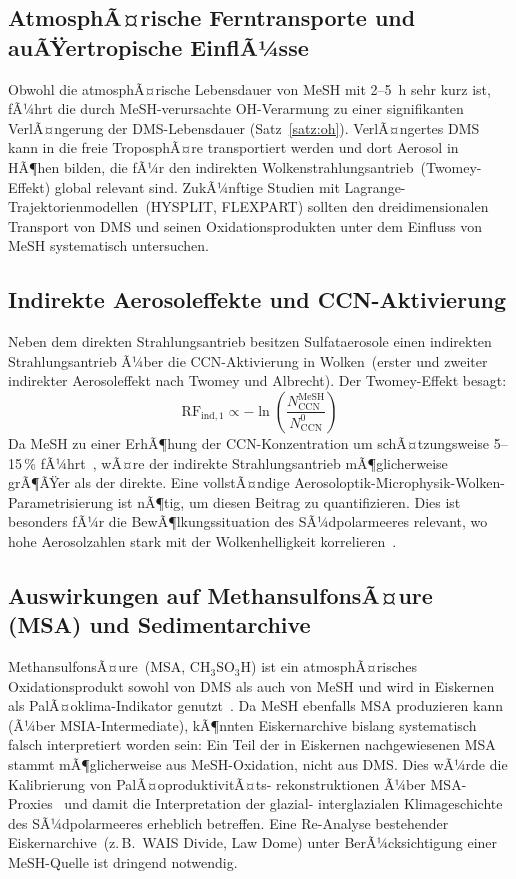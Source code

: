 ﻿\documentclass[a4paper,12pt]{article}
\theoremstyle{definition}
\begin{document}
\subsection{AtmosphÃ¤rische Ferntransporte und auÃŸertropische EinflÃ¼sse}

Obwohl die atmosphÃ¤rische Lebensdauer von MeSH mit 2--5~h sehr kurz ist, fÃ¼hrt die durch
MeSH-verursachte OH-Verarmung zu einer signifikanten VerlÃ¤ngerung der DMS-Lebensdauer (Satz~\ref{satz:oh}).
VerlÃ¤ngertes DMS kann in die freie TroposphÃ¤re transportiert werden und dort Aerosol in
HÃ¶hen bilden, die fÃ¼r den indirekten Wolkenstrahlungsantrieb~(Twomey-Effekt) global relevant sind.
ZukÃ¼nftige Studien mit Lagrange-Trajektorienmodellen~(HYSPLIT, FLEXPART) sollten den
dreidimensionalen Transport von DMS und seinen Oxidationsprodukten unter dem Einfluss von MeSH
systematisch untersuchen.

\subsection{Indirekte Aerosoleffekte und CCN-Aktivierung}

Neben dem direkten Strahlungsantrieb besitzen Sulfataerosole einen indirekten Strahlungsantrieb
Ã¼ber die CCN-Aktivierung in Wolken~(erster und zweiter indirekter Aerosoleffekt nach Twomey und
Albrecht). Der Twomey-Effekt besagt:
\[
  \mathrm{RF}_{\mathrm{ind,1}} \propto -\ln\left(\frac{N_{\mathrm{CCN}}^{\mathrm{MeSH}}}{N_{\mathrm{CCN}}^0}\right)
\]
Da MeSH zu einer ErhÃ¶hung der CCN-Konzentration um schÃ¤tzungsweise 5--15\,\% fÃ¼hrt~\cite{wohl2024},
wÃ¤re der indirekte Strahlungsantrieb mÃ¶glicherweise grÃ¶ÃŸer als der direkte. Eine vollstÃ¤ndige
Aerosoloptik-Microphysik-Wolken-Parametrisierung ist nÃ¶tig, um diesen Beitrag zu quantifizieren.
Dies ist besonders fÃ¼r die BewÃ¶lkungssituation des SÃ¼dpolarmeeres relevant, wo hohe Aerosolzahlen
stark mit der Wolkenhelligkeit korrelieren~\cite{mccoy2015}.

\subsection{Auswirkungen auf MethansulfonsÃ¤ure (MSA) und Sedimentarchive}

MethansulfonsÃ¤ure~(MSA, \(\mathrm{CH_3SO_3H}\)) ist ein atmosphÃ¤risches Oxidationsprodukt sowohl
von DMS als auch von MeSH und wird in Eiskernen als PalÃ¤oklima-Indikator genutzt~\cite{legrand1988}.
Da MeSH ebenfalls MSA produzieren kann (Ã¼ber MSIA-Intermediate), kÃ¶nnten Eiskernarchive bislang
systematisch falsch interpretiert worden sein: Ein Teil der in Eiskernen nachgewiesenen MSA stammt
mÃ¶glicherweise aus MeSH-Oxidation, nicht aus DMS. Dies wÃ¼rde die Kalibrierung von PalÃ¤oproduktivitÃ¤ts-
rekonstruktionen Ã¼ber MSA-Proxies~\cite{curran2003} und damit die Interpretation der glazial-
interglazialen Klimageschichte des SÃ¼dpolarmeeres erheblich betreffen. Eine Re-Analyse bestehender
Eiskernarchive~(z.\,B.\ WAIS Divide, Law Dome) unter BerÃ¼cksichtigung einer MeSH-Quelle ist dringend
notwendig.
\end{document}

